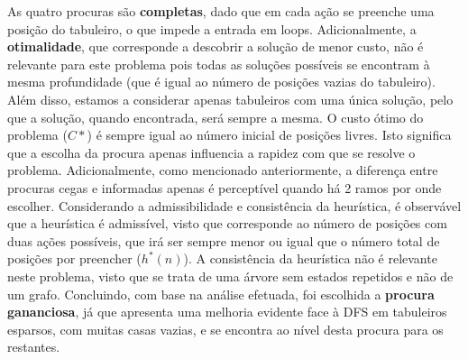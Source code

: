 \documentclass[12pt,a4paper]{article}
\begin{document}
As quatro procuras são \textbf{completas}, dado que em cada ação se preenche uma posição do tabuleiro,
o que impede a entrada em loops.
Adicionalmente, a \textbf{otimalidade}, que corresponde a descobrir a solução de menor custo,
não é relevante para este problema pois todas as soluções possíveis se encontram à mesma profundidade
(que é igual ao número de posições vazias do tabuleiro).
Além disso, estamos a considerar apenas tabuleiros com uma única solução,
pelo que a solução, quando encontrada, será sempre a mesma.
O custo ótimo do problema (\(C*\)) é sempre igual ao número inicial de posições livres.
Isto significa que a escolha da procura apenas influencia a rapidez com que se resolve o problema.
Adicionalmente, como mencionado anteriormente, a diferença entre procuras cegas e informadas apenas é perceptível quando
há 2 ramos por onde escolher.
Considerando a admissibilidade e consistência da heurística, é observável que
a heurística é admissível, visto que corresponde ao número de posições com duas ações possíveis, que
irá ser sempre menor ou igual que o número total de posições por preencher (\(h^*(n)\)).
A consistência da heurística não é relevante neste problema, visto que se trata de uma árvore sem estados repetidos e não
de um grafo.
Concluindo, com base na análise efetuada, foi escolhida a \textbf{procura gananciosa}, já que
apresenta uma melhoria evidente face à DFS em tabuleiros esparsos, com muitas casas vazias, e se
encontra ao nível desta procura para os restantes.
\end{document}
